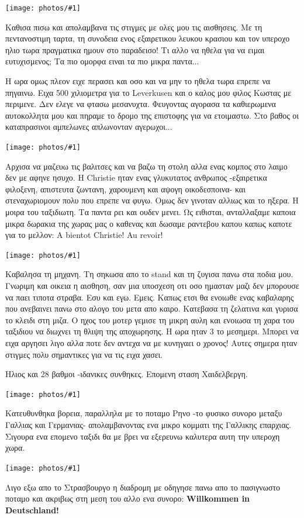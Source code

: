 \documentclass[11pt, letterpaper]{book}
\newcommand\photo[1]{\noindent\texttt{[image: photos/\#1]}}
\begin{document}
\photo{112.jpg}

Καθισα πισω και απολαμβανα τις στιγμες με ολες μου τις αισθησεις. Με τη πεντανοστιμη ταρτα, τη συνοδεια ενος εξαιρετικου λευκου κρασιου και τον υπεροχο ηλιο τωρα πραγματικα ημουν στο παραδεισο! Τι αλλο να ηθελα για να ειμαι ευτυχισμενος; Τα πιο ομορφα ειναι τα πιο μικρα παντα...

Η ωρα ομως πλεον ειχε περασει και οσο και να μην το ηθελα τωρα επρεπε να πηγαινω.
Ειχα 500 χιλιομετρα για το Leverkusen και ο καλος μου φιλος Κωστας με περιμενε. Δεν ελεγε να φτασω μεσανυχτα.
Φευγοντας αγορασα τα καθιερωμενα αυτοκολλητα μου και πηραμε το δρομο της επιστοφης για να ετοιμαστω. Στο βαθος οι καταπρασινοι αμπελωνες απλωνονταν αγερωχοι...

\photo{113.jpg}

Αρχισα να μαζευω τις βαλιτσες και να βαζω τη στολη αλλα ενας κομπος στο λαιμο δεν με αφηνε ησυχο. Η Christie ηταν ενας γλυκυτατος ανθρωπος -εξαιρετικα φιλοξενη, απιστευτα ζωντανη, χαρουμενη και αψογη οικοδεσποινα- και στεναχωριομουν πολυ που επρεπε να φυγω. Ομως δεν γινοταν αλλιως και το ηξερα. Η μοιρα του ταξιδιωτη. Τα παντα ρει και ουδεν μενει. 
Ως ειθισται, ανταλλαξαμε καποια μικρα δωρακια της χωρας μας ο καθενας και δωσαμε ραντεβου καπου καπως καποτε για το μελλον: 
A bientot Christie! Au revoir!

\photo{114.jpg}

Καβαλησα τη μηχανη. Τη σηκωσα απο το stand και τη ζυγισα πανω στα ποδια μου. Γνωριμη και οικεια η αισθηση, σαν μια υποσχεση οτι οσο ημασταν μαζι δεν μπορουσε να παει τιποτα στραβα. Εσυ και εγω. Εμεις.
Καπως ετσι θα ενοιωθε ενας καβαλαρης που ανεβαινει πανω στο αλογο του μετα απο καιρο. 
Κατεβασα τη ζελατινα και γυρισα το κλειδι στη μιζα. Ο ηχος του μοτερ γεμισε τη μικρη αυλη και ενοιωσα τη χαρα του ταξιδιου να διωχνει τη θλιψη της αποχωρησης. Η ωρα ηταν 3 το μεσημερι. Μπορει να ειχα αργησει λιγο αλλα ποτε δεν αντεχα να με κυνηγαει ο χρονος! Αυτες σημερα ηταν στιγμες πολυ σημαντικες για να τις ειχα χασει.

Ηλιος και 28 βαθμοι -ιδανικες συνθηκες. Επομενη σταση Χαιδελβεργη.

\photo{115.jpg}

Κατευθυνθηκα βορεια, παραλληλα με το ποταμο Ρηνο -το φυσικο συνορο μεταξυ Γαλλιας και Γερμανιας- απολαμβανοντας ενα μικρο κομματι της Γαλλικης επαρχιας. 
Σιγουρα ενα επομενο ταξιδι θα με βρει να εξερευνω καλυτερα αυτη την υπεροχη χωρα. 

\photo{116.jpg}

Λιγο εξω απο το Στρασβουργο η διαδρομη με οδηγησε πανω απο το πασιγνωστο ποταμο και ακριβως στη μεση του αλλο ενα συνορο: \textbf{Willkommen in Deutschland!}
\end{document}

